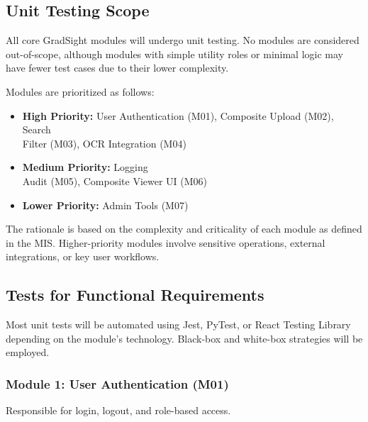 \documentclass[12pt, titlepage]{article}
\begin{document}
\subsection{Unit Testing Scope}

All core GradSight modules will undergo unit testing. No modules are considered out-of-scope, although modules with simple utility roles or minimal logic may have fewer test cases due to their lower complexity.

Modules are prioritized as follows:
\begin{itemize}
  \item \textbf{High Priority:} User Authentication (M01), Composite Upload (M02), Search \\ Filter (M03), OCR Integration (M04)
  \item \textbf{Medium Priority:} Logging \\ Audit (M05), Composite Viewer UI (M06)
  \item \textbf{Lower Priority:} Admin Tools (M07)
\end{itemize}

The rationale is based on the complexity and criticality of each module as defined in the MIS. Higher-priority modules involve sensitive operations, external integrations, or key user workflows.

\subsection{Tests for Functional Requirements}

Most unit tests will be automated using Jest, PyTest, or React Testing Library depending on the module's technology. Black-box and white-box strategies will be employed.

\subsubsection{Module 1: User Authentication (M01)}
Responsible for login, logout, and role-based access.
\end{document}

